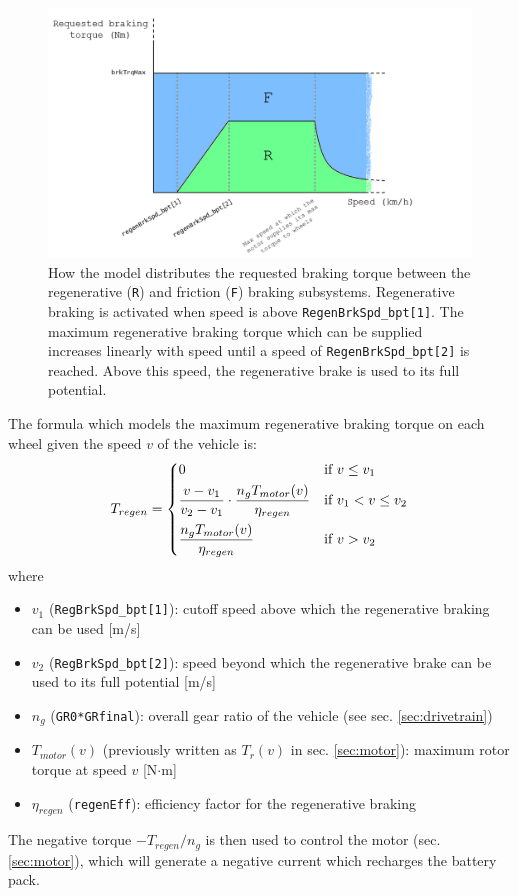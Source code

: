 \begin{figure}[htb]
    \centering
    \includegraphics[width=\textwidth]{images/braking_distribution}
    \caption[Friction and regenerative braking torque distribution]{How the model distributes the requested braking torque between the regenerative (\texttt{R}) and friction (\texttt{F}) braking subsystems. Regenerative braking is activated when speed is above \texttt{RegenBrkSpd\_bpt[1]}. The maximum regenerative braking torque which can be supplied increases linearly with speed until a speed of \texttt{RegenBrkSpd\_bpt[2]} is reached. Above this speed, the regenerative brake is used to its full potential.}
    \label{fig:braking_distribution}
\end{figure}

The formula which models the maximum regenerative braking torque on each wheel given the speed $v$ of the vehicle is:
\begin{equation}
T_{regen} =
\begin{dcases}
    0 & \text{if } v \leq v_1\\
    \frac{v-v_1}{v_2-v_1} \cdot \frac{n_g T_{motor}(v)}{\eta_{regen}} & \text{if } v_1 < v \leq v_2\\
    \frac{n_g T_{motor}(v)}{\eta_{regen}} & \text{if } v > v_2\\
\end{dcases}
\end{equation}
where
\begin{itemize}
    \item $v_1$ (\texttt{RegBrkSpd\_bpt[1]}): cutoff speed above which the regenerative braking can be used [m/s]
    \item $v_2$ (\texttt{RegBrkSpd\_bpt[2]}): speed beyond which the regenerative brake can be used to its full potential [m/s]
    \item $n_g$ (\texttt{GR0*GRfinal}): overall gear ratio of the vehicle (see sec. \ref{sec:drivetrain})
    \item $T_{motor}(v)$ (previously written as $T_r(v)$ in sec. \ref{sec:motor}): maximum rotor torque at speed $v$ [N$\cdot$m]
    \item $\eta_{regen}$ (\texttt{regenEff}): efficiency factor for the regenerative braking
\end{itemize}
The negative torque $-T_{regen}/n_g$ is then used to control the motor (sec. \ref{sec:motor}), which will generate a negative current which recharges the battery pack.

